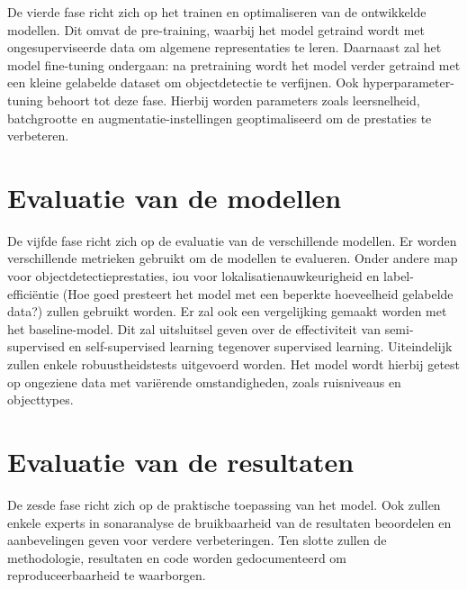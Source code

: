 De vierde fase richt zich op het trainen en optimaliseren van de ontwikkelde modellen. Dit omvat de pre-training, waarbij het model getraind wordt met ongesuperviseerde data om algemene representaties te leren. Daarnaast zal het model fine-tuning ondergaan: na pretraining wordt het model verder getraind met een kleine gelabelde dataset om objectdetectie te verfijnen. Ook hyperparameter-tuning behoort tot deze fase. Hierbij worden parameters zoals leersnelheid, batchgrootte en augmentatie-instellingen geoptimaliseerd om de prestaties te verbeteren.

\section{Evaluatie van de modellen}

De vijfde fase richt zich op de evaluatie van de verschillende modellen. Er worden verschillende metrieken gebruikt om de modellen te evalueren. Onder andere \acrfull{map} voor objectdetectieprestaties, \acrfull{iou} voor lokalisatienauwkeurigheid en label-efficiëntie (Hoe goed presteert het model met een beperkte hoeveelheid gelabelde data?) zullen gebruikt worden. Er zal ook een vergelijking gemaakt worden met het baseline-model. Dit zal uitsluitsel geven over de effectiviteit van semi-supervised en self-supervised learning tegenover supervised learning. Uiteindelijk zullen enkele robuustheidstests uitgevoerd worden. Het model wordt hierbij getest op ongeziene data met variërende omstandigheden, zoals ruisniveaus en objecttypes.

\section{Evaluatie van de resultaten}

De zesde fase richt zich op de praktische toepassing van het model. Ook zullen enkele experts in sonaranalyse de bruikbaarheid van de resultaten beoordelen en aanbevelingen geven voor verdere verbeteringen. Ten slotte zullen de methodologie, resultaten en code worden gedocumenteerd om reproduceerbaarheid te waarborgen.
